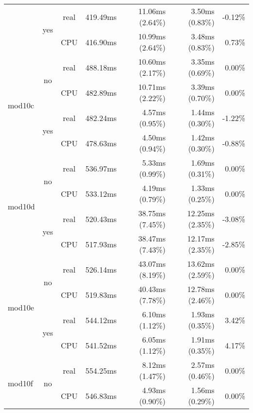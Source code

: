 \documentclass[en]{pracamgr}
\begin{document}
\begin{appendices}
\begin{small}
\begin{longtable}{|l|c|c|r|r|r|r|}
                          \cline{2-7}
                          & \multirow{2}{*}{yes} & real & 419.49ms & 11.06ms (2.64\%) & 3.50ms (0.83\%) & -0.12\% \\*
                          &                      & CPU  & 416.90ms & 10.99ms (2.64\%) & 3.48ms (0.83\%) & 0.73\% \\
\hline
\multirow{4}{*}{mod10c}   & \multirow{2}{*}{no}  & real & 488.18ms & 10.60ms (2.17\%) & 3.35ms (0.69\%) & 0.00\% \\*
                          &                      & CPU  & 482.89ms & 10.71ms (2.22\%) & 3.39ms (0.70\%) & 0.00\% \\*
                          \cline{2-7}
                          & \multirow{2}{*}{yes} & real & 482.24ms & 4.57ms (0.95\%) & 1.44ms (0.30\%) & -1.22\% \\*
                          &                      & CPU  & 478.63ms & 4.50ms (0.94\%) & 1.42ms (0.30\%) & -0.88\% \\
\hline
\multirow{4}{*}{mod10d}   & \multirow{2}{*}{no}  & real & 536.97ms & 5.33ms (0.99\%) & 1.69ms (0.31\%) & 0.00\% \\*
                          &                      & CPU  & 533.12ms & 4.19ms (0.79\%) & 1.33ms (0.25\%) & 0.00\% \\*
                          \cline{2-7}
                          & \multirow{2}{*}{yes} & real & 520.43ms & 38.75ms (7.45\%) & 12.25ms (2.35\%) & -3.08\% \\*
                          &                      & CPU  & 517.93ms & 38.47ms (7.43\%) & 12.17ms (2.35\%) & -2.85\% \\
\hline
\multirow{4}{*}{mod10e}   & \multirow{2}{*}{no}  & real & 526.14ms & 43.07ms (8.19\%) & 13.62ms (2.59\%) & 0.00\% \\*
                          &                      & CPU  & 519.83ms & 40.43ms (7.78\%) & 12.78ms (2.46\%) & 0.00\% \\*
                          \cline{2-7}
                          & \multirow{2}{*}{yes} & real & 544.12ms & 6.10ms (1.12\%) & 1.93ms (0.35\%) & 3.42\% \\*
                          &                      & CPU  & 541.52ms & 6.05ms (1.12\%) & 1.91ms (0.35\%) & 4.17\% \\
\hline
\multirow{4}{*}{mod10f}   & \multirow{2}{*}{no}  & real & 554.25ms & 8.12ms (1.47\%) & 2.57ms (0.46\%) & 0.00\% \\*
                          &                      & CPU  & 546.83ms & 4.93ms (0.90\%) & 1.56ms (0.29\%) & 0.00\% \\*

\end{longtable}
\end{small}
\end{appendices}
\end{document}
